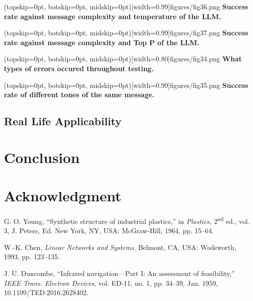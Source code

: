 \documentclass{ieeeaccess}
\begin{document}
\Figure[t!](topskip=0pt, botskip=0pt,
midskip=0pt)[width=0.99\columnwidth]{{figures/fig36.png}}
{ \textbf{Success rate against message complexity and temperature of the LLM.}\label{fig10}}

\Figure[t!](topskip=0pt, botskip=0pt,
midskip=0pt)[width=0.99\columnwidth]{{figures/fig37.png}}
{ \textbf{Success rate against message complexity and Top P of the LLM.}\label{fig11}}

\Figure[t!](topskip=0pt, botskip=0pt,
midskip=0pt)[width=0.80\columnwidth]{{figures/fig34.png}}
{ \textbf{What types of errors occured throughout testing.}\label{fig12}}

\Figure[t!](topskip=0pt, botskip=0pt,
midskip=0pt)[width=0.99\columnwidth]{{figures/fig35.png}}
{ \textbf{Success rate of different tones of the same message.}\label{fig13}}


\subsection{Real Life Applicability}

\section{Conclusion}


\section*{Acknowledgment}


\begin{thebibliography}{00}

     G. O. Young, ``Synthetic structure of industrial plastics,''
    in \emph{Plastics,} 2\textsuperscript{nd} ed., vol. 3, J. Peters, Ed. New York,
    NY, USA: McGraw-Hill, 1964, pp. 15--64.

     W.-K. Chen, \emph{Linear Networks and Systems.} Belmont, CA,
    USA: Wadsworth, 1993, pp. 123--135.

     J. U. Duncombe, ``Infrared navigation---Part I: An assessment
    of feasibility,'' \emph{IEEE Trans. Electron Devices}, vol. ED-11, no. 1, pp.
    34--39, Jan. 1959, 10.1109/TED.2016.2628402.


\end{thebibliography}
\end{document}
